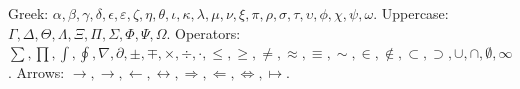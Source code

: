 \documentclass{article}
\begin{document}
Greek: $\alpha, \beta, \gamma, \delta, \epsilon, \varepsilon, \zeta, \eta, \theta, \iota, \kappa, \lambda, \mu, \nu, \xi, \pi, \rho, \sigma, \tau, \upsilon, \phi, \chi, \psi, \omega$.
Uppercase: $\Gamma, \Delta, \Theta, \Lambda, \Xi, \Pi, \Sigma, \Phi, \Psi, \Omega$.
Operators: $\sum, \prod, \int, \oint, \nabla, \partial, \pm, \mp, \times, \div, \cdot, \leq, \geq, \neq, \approx, \equiv, \sim, \in, \notin, \subset, \supset, \cup, \cap, \emptyset, \infty$.
Arrows: $\to, \rightarrow, \leftarrow, \leftrightarrow, \Rightarrow, \Leftarrow, \Leftrightarrow, \mapsto$.
\end{document}
